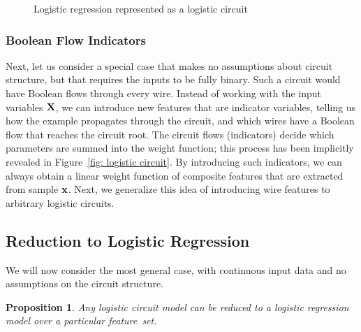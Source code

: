 \documentclass[letterpaper]{article} %
\newtheorem{proposition}[corollary]{Proposition}
\newcommand{\sample}{{\bf x}}
\begin{document}
\begin{figure}[t]
\begin{minipage}{0.48\textwidth}
{
}
\caption{Logistic regression represented as a logistic circuit}
\label{circuit: linear weights}
\end{minipage}
\end{figure}


\subsubsection{Boolean Flow Indicators}
Next, let us consider a special case that makes no assumptions about circuit structure, but that requires the inputs to be fully binary.
Such a circuit would have Boolean flows through every wire.
Instead of working with the input variables $\bf X$, we can introduce new features that are indicator variables, telling us how the example propagates through the circuit, and which wires have a Boolean flow that reaches the circuit root. The circuit flows (indicators) decide which parameters are summed into the weight function; this process has been implicitly revealed in Figure~\ref{fig: logistic circuit}. By introducing such indicators, we can always obtain a linear weight function of composite features that are extracted from sample $\sample$.
Next, we generalize this idea of introducing wire features to arbitrary logistic circuits.

\subsection{Reduction to Logistic Regression}
We will now consider the most general case, with continuous input data and no assumptions on the circuit structure.

\begin{proposition}
\label{proposition: logistic regression}
Any logistic circuit model can be reduced to a logistic regression model over a particular feature~set.
\end{proposition}
\end{document}
